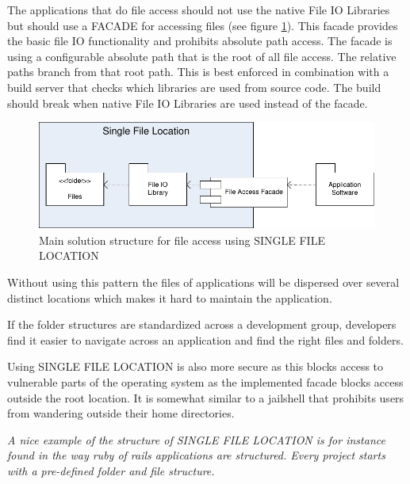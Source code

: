 The applications that do file access should not use the native File IO Libraries but should use a FACADE for accessing files (see figure \ref{fig:singleFileLocationDiagram-02}). This facade provides the basic file IO functionality and prohibits absolute path access. The facade is using a configurable absolute path that is the root of all file access. The relative paths branch from that root path.  This is best enforced in combination with a build server that checks which libraries are used from source code. The build should break when native File IO Libraries are used instead of the facade.

\begin{figure}[h!]
\centering
\includegraphics{patterns/singleFileLocationDiagram-02.pdf}
\caption{Main solution structure for file access using SINGLE FILE LOCATION}
\label{fig:singleFileLocationDiagram-02}
\end{figure}

Without using this pattern the files of applications will be dispersed over several distinct locations which makes it hard to maintain the application. 

If the folder structures are standardized across a development group, developers find it easier to navigate across an application and find the right files and folders.

Using SINGLE FILE LOCATION is also more secure as this blocks access to vulnerable parts of the operating system as the implemented facade blocks access outside the root location. It is somewhat similar to a jailshell that prohibits users from wandering outside their home directories.

\textit{A nice example of the structure of SINGLE FILE LOCATION is for instance found in the way ruby of rails applications are structured. Every project starts with a pre-defined folder and file structure.}
 





